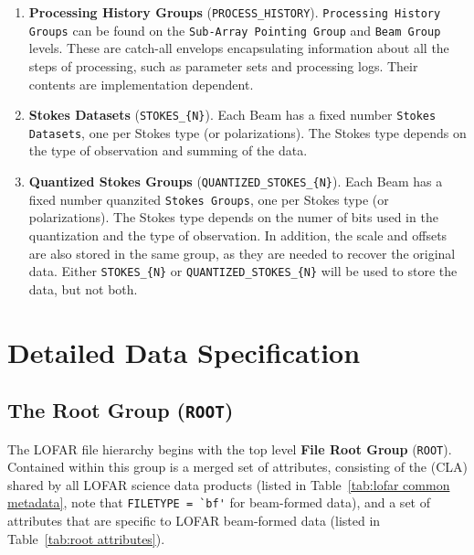 \documentclass[a4paper,10pt,bibtotoc]{scrartcl}
\begin{document}
\begin{enumerate}
\item \textbf{Processing History Groups} (\verb|PROCESS_HISTORY|). \texttt{Processing History
    Groups} can be found on the \texttt{Sub-Array Pointing Group} and
  \texttt{Beam Group} levels. These are catch-all envelops
  encapsulating information about all the steps of processing, such as
  parameter sets and processing logs. Their contents are implementation dependent.

\item \textbf{Stokes Datasets} (\verb|STOKES_{N}|). Each Beam has a fixed number
  \texttt{Stokes Datasets}, one per Stokes type (or polarizations).  The
  Stokes type depends on the type of observation and summing of the
  data.  

\item \textbf{Quantized Stokes Groups} (\verb|QUANTIZED_STOKES_{N}|). Each Beam has a fixed number
  quanzited \texttt{Stokes Groups}, one per Stokes type (or polarizations).  The
  Stokes type depends on the numer of bits used in the quantization and the type of observation. In addition, the scale and offsets are also stored in the same group, as they are needed to recover the original data. Either \verb|STOKES_{N}| or \verb|QUANTIZED_STOKES_{N}| will be used to store the data, but not both.

\end{enumerate}


\section{Detailed Data Specification}
\label{sec:detailed data structure}



\subsection{The Root Group ({\tt ROOT})}
\label{sec:root group}

The LOFAR file hierarchy begins with the top level \textbf{File Root
  Group} (\verb|ROOT|). Contained within this group is a merged set of attributes, consisting of the {\cla} (CLA) shared by all LOFAR science data products (listed in Table~\ref{tab:lofar common metadata}, note that \verb|FILETYPE = `bf'| for beam-formed data), and a set of attributes that are specific to LOFAR beam-formed data (listed in Table~\ref{tab:root attributes}).
\end{document}
